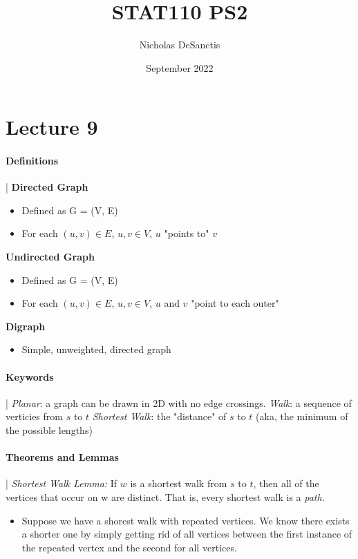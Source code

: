 \documentclass{article}
\title{STAT110 PS2}
\author{Nicholas DeSanctis}
\date{September 2022}
\begin{document}
\maketitle

\section*{Lecture 9}
\paragraph*{Definitions} |
\newline
\newline
\textbf{Directed Graph}
\begin{itemize}
  \item Defined as G = (V, E)
  \item For each $(u, v) \in E$, $u, v \in V$, $u$ "points to" $v$
\end{itemize}
\textbf{Undirected Graph} 
\begin{itemize}
  \item Defined as G = (V, E)
  \item For each $(u, v) \in E$, $u, v \in V$, $u$ and $v$ "point to each outer"
\end{itemize}
\textbf{Digraph}
\begin{itemize}
  \item Simple, unweighted, directed graph
\end{itemize}
\paragraph*{Keywords} |
\newline
\newline
\emph{Planar}: a graph can be drawn in 2D with no edge crossings.
\newline
\newline
\emph{Walk}: a sequence of verticies from $s$ to $t$
\newline
\newline
\emph{Shortest Walk}: the "distance" of $s$ to $t$ (aka, the minimum of the possible lengths)
\paragraph*{Theorems and Lemmas} |
\newline
\newline
\emph{Shortest Walk Lemma: } If $w$ is a shortest walk from $s$ to $t$, then all of the vertices that occur on w are distinct.
That is, every shortest walk is a \emph{path}.
\begin{itemize}
  \item Suppose we have a shorest walk with repeated vertices. We know there exists a shorter one
  by simply getting rid of all vertices between the first instance of the repeated vertex and the second
  for all vertices.
\end{itemize}
\end{document}
